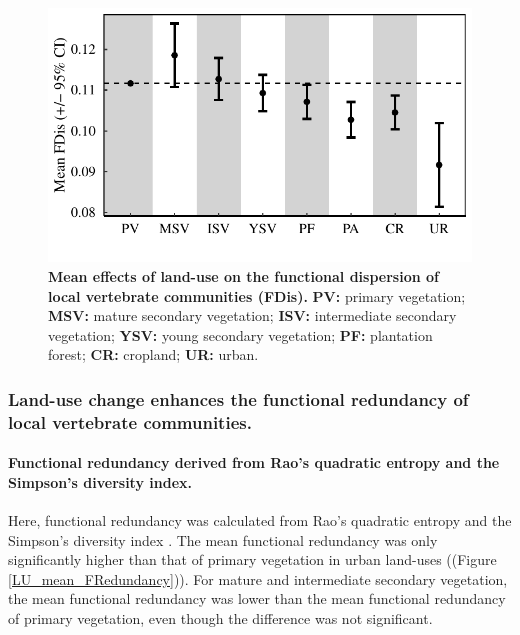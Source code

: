 \begin{figure}[h!]
\centering
\includegraphics[scale=0.70]{figures/chapter3/FDis/Mean_effect}
\caption[Mean effects of land-use on the functional dispersion of local vertebrate communities]{\textbf{Mean effects of land-use on the functional dispersion of local vertebrate communities (FDis).} \textbf{PV:} primary vegetation; \textbf{MSV:} mature secondary vegetation; \textbf{ISV:} intermediate secondary vegetation; \textbf{YSV:} young secondary vegetation; \textbf{PF:} plantation forest; \textbf{CR:} cropland; \textbf{UR:} urban.}
\label{LU_mean_FDis}
\end{figure}


\subsubsection{Land-use change enhances the functional redundancy of local vertebrate communities.}

\paragraph{Functional redundancy derived from Rao's quadratic entropy and the Simpson's diversity index.}
Here, functional redundancy was calculated from Rao's quadratic entropy and the Simpson's diversity index \citep{Ricotta2016}. The mean functional redundancy was only significantly higher than that of primary vegetation in urban land-uses ((Figure \ref{LU_mean_FRedundancy})). For mature and intermediate secondary vegetation, the mean functional redundancy was lower than the mean functional redundancy of primary vegetation, even though the difference was not significant.

